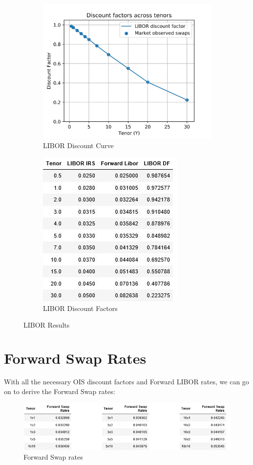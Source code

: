 \documentclass{article}
\begin{document}
\begin{figure}[h]
	\centering
	\begin{subfigure}{.5\textwidth}
		\centering
		\includegraphics[width=.4\linewidth]{./images/LIBOR_df.jpg}
		\caption{LIBOR Discount Curve}
		\label{fig:sub1}
	\end{subfigure}%
	\begin{subfigure}{.5\textwidth}
		\centering
		\includegraphics[width=.4\linewidth]{./images/LIBORtable.jpg}
		\caption{LIBOR Discount Factors}
		\label{fig:sub2}
	\end{subfigure}
	\caption{LIBOR Results}
	\label{fig:test}
\end{figure}


\section{Forward Swap Rates}

\noindent With all the necessary OIS discount factors and Forward LIBOR rates, we can go on to derive the Forward Swap rates:

\begin{figure}[ht]
	\centering
	\includegraphics[width= \linewidth]{./images/FwdSwaps.jpg}
	\caption{Forward Swap rates}
\end{figure}
\end{document}
